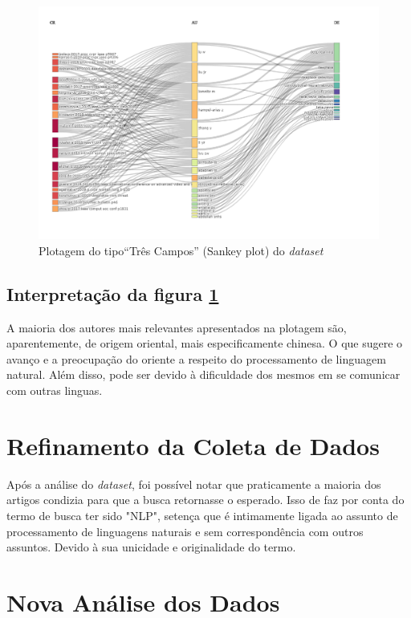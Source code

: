 \begin{figure}
    \centering
    \includegraphics[width=1\textwidth]{experiments/titofrota/PesquisaBibliometrica/Deepfakes/ThreeFieldPlot.png}
    \caption{Plotagem do tipo``Três Campos'' (Sankey plot) do \textit{dataset}}
    \label{fig:DEEPFAKES@titofrota:ThreeFieldPlot}
\end{figure}

\subsection{Interpretação da figura \ref{fig:DEEPFAKES@titofrota:ThreeFieldPlot}}
A maioria dos autores mais relevantes apresentados na plotagem são, aparentemente, de origem oriental, mais especificamente chinesa. O que sugere o avanço e a preocupação do oriente a respeito do processamento de linguagem natural. Além disso, pode ser devido à dificuldade dos mesmos em se comunicar com outras linguas.


\section{Refinamento da Coleta de Dados}

Após a análise do \textit{dataset}, foi possível notar que praticamente a maioria dos artigos condizia para que a busca retornasse o esperado. Isso de faz por conta do termo de busca ter sido "NLP", setença que é intimamente ligada ao assunto de processamento de linguagens naturais e sem correspondência com outros assuntos. Devido à sua unicidade e originalidade do termo.

\section{Nova Análise dos Dados}

